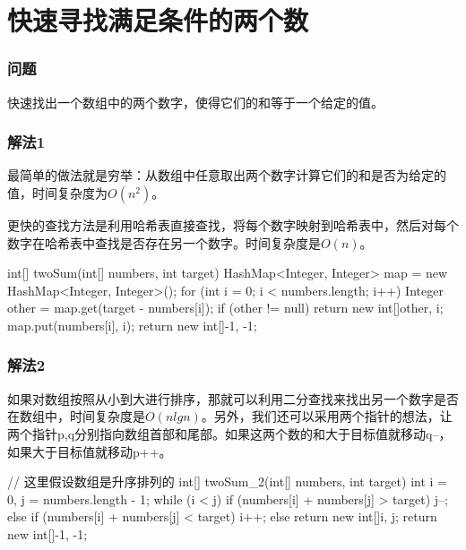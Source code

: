 \section{快速寻找满足条件的两个数} %
\label{sec:two-sum}

\subsubsection{问题}
快速找出一个数组中的两个数字，使得它们的和等于一个给定的值。

\subsubsection{解法1}
最简单的做法就是穷举：从数组中任意取出两个数字计算它们的和是否为给定的值，时间复杂度为$O(n^2)$。

更快的查找方法是利用哈希表直接查找，将每个数字映射到哈希表中，然后对每个数字在哈希表中查找是否存在另一个数字。时间复杂度是$O(n)$。

\begin{Codex}[label={[$O(n)+O(n)$]Chap02_12_TwoSum.java}]
	int[] twoSum(int[] numbers, int target) {
		HashMap<Integer, Integer> map = new HashMap<Integer, Integer>();
		for (int i = 0; i < numbers.length; i++) {
			Integer other = map.get(target - numbers[i]);
			if (other != null) {
				return new int[]{other, i};
			}
			map.put(numbers[i], i);
		}
		return new int[]{-1, -1};
	}
\end{Codex}

\subsubsection{解法2}
如果对数组按照从小到大进行排序，那就可以利用二分查找来找出另一个数字是否在数组中，时间复杂度是$O(nlgn)$。另外，我们还可以采用两个指针的想法，让两个指针p,q分别指向数组首部和尾部。如果这两个数的和大于目标值就移动q--，
如果大于目标值就移动p++。

\begin{Codex}[label={[$O(n)+O(1)$]Chap02_12_TwoSum.java}]
	// 这里假设数组是升序排列的
	int[] twoSum_2(int[] numbers, int target) {
		int i = 0, j = numbers.length - 1;
		while (i < j) {
			if (numbers[i] + numbers[j] > target) {
				j--;
			} else if (numbers[i] + numbers[j] < target) {
			i++;
		} else {
		return new int[]{i, j};
	}
}
return new int[]{-1, -1};
}
\end{Codex}


